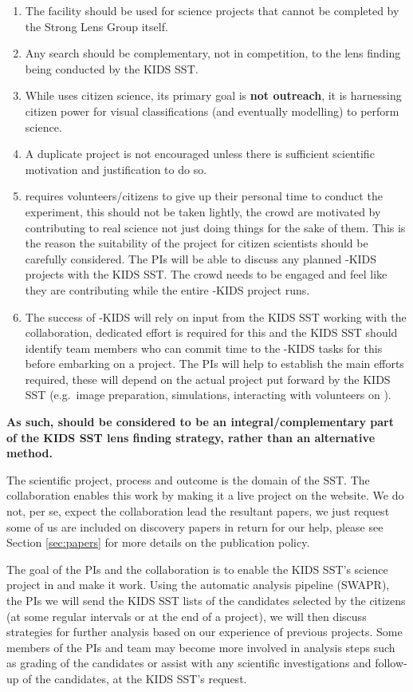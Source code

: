 \documentclass[a4paper,twocolumn]{article}
\begin{document}
\begin{enumerate}
\item The \SW facility should be used for science projects that cannot be completed by the Strong Lens Group itself. 
\item Any \SW search should be complementary, not in competition, to the lens finding being conducted by the KIDS SST.
\item While \SW uses citizen science, its primary goal is \textbf{not outreach}, it is harnessing citizen power for visual classifications (and eventually modelling) to perform science.
\item A duplicate project is not encouraged unless there is sufficient scientific motivation and justification to do so.
\item \SW requires volunteers/citizens to give up their personal time to conduct the experiment, this should not be taken lightly, the crowd are motivated by contributing to real science not just doing things for the sake of them. This is the reason the suitability of the project for citizen scientists should be carefully considered. The \SW PIs will be able to discuss any planned \SW-KIDS projects with the KIDS SST. The crowd needs to be engaged and feel like they are contributing while the entire \SW-KIDS project runs.
\item The success of \SW-KIDS will rely on input from the KIDS SST working with the \SW collaboration, dedicated effort is required for this and the KIDS SST should identify team members who can commit time to the \SW-KIDS tasks for this before embarking on a project. The \SW PIs will help to establish the main efforts required, these will depend on the actual project put forward by the KIDS SST (e.g.\ image preparation, simulations, interacting with volunteers on \Talk).
\end{enumerate}

\textbf{As such, \SW should be considered to be an integral/complementary part of the KIDS SST lens finding strategy, rather than an alternative method.}

The scientific project, process and outcome is the domain of the
SST. The \SW collaboration enables this work by making it a live
project on the website. We do not, per se, expect the \SW
collaboration lead the resultant papers, we just request some of us
are included on discovery papers in return for our help, please see
Section \ref{sec:papers} for more details on the publication policy.

The goal of the \SW PIs and the \SW collaboration is to enable the
KIDS SST's science project in \sw and make it work. Using the
automatic analysis pipeline (SWAPR), the \SW PIs we will send the KIDS
SST lists of the candidates selected by the citizens (at some regular
intervals or at the end of a project), we will then discuss strategies
for further analysis based on our experience of previous
projects. Some members of the \SW PIs and team may become more
involved in analysis steps such as grading of the \sw candidates or
assist with any scientific investigations and follow-up of the
candidates, at the KIDS SST's request.
\end{document}
